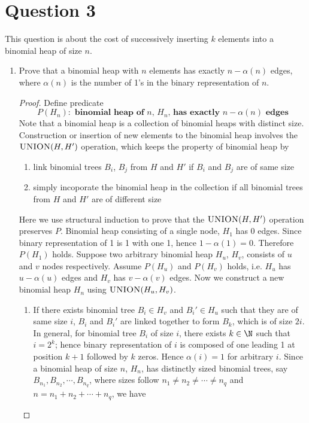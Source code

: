 \documentclass[11pt]{article}
\begin{document}
\section*{Question 3}
This question is about the cost of successively inserting $k$ elements into a
binomial heap of size $n$.
\begin{enumerate}
  \item Prove that a binomial heap with $n$ elements has exactly $n- \alpha(n)$ edges, where $\alpha(n)$ is the
number of 1’s in the binary representation of $n$.
  \begin{proof}
    Define predicate
    \[
      P(H_n): \textbf{ binomial heap of $n$, $H_n$, has exactly $n-\alpha(n)$ edges}
    \]
    Note that a binomial heap is a collection of binomial heaps with distinct size. Construction or insertion of new elements to the binomial heap involves the $\textsc{UNION}(H, H')$ operation, which keeps the property of binomial heap by
    \begin{enumerate}
      \item link binomial trees $B_i$, $B_j$ from $H$ and $H'$ if $B_i$ and $B_j$ are of same size
      \item simply incoporate the binomial heap in the collection if all binomial trees from $H$ and $H'$ are of different size
    \end{enumerate}
    Here we use structural induction to prove that the $\textsc{UNION}(H, H')$ operation preserves $P$. Binomial heap consisting of a single node, $H_1$ has 0 edges. Since binary representation of 1 is 1 with one 1, hence $1-\alpha(1) = 0$. Therefore $P(H_1)$ holds. Suppose two arbitrary binomial heap $H_u$, $H_v$, consists of $u$ and $v$ nodes respectively. Assume $P(H_u)$ and $P(H_v)$ holds, i.e. $H_u$ has $u-\alpha(u)$ edges and $H_v$ has $v-\alpha(v)$ edges. Now we construct a new binomial heap $H_n$ using $\textsc{UNION}(H_u, H_v)$.
    \begin{enumerate}
      \item If there exists binomial tree $B_i \in H_v$ and $B_i' \in H_u$ such that they are of same size $i$, $B_i$ and $B_i'$ are linked together to form $B_k$, which is of size $2i$. In general, for binomial tree $B_i$ of size $i$, there exists $k\in\N$ such that $i = 2^k$; hence binary representation of $i$ is composed of one leading 1 at position $k+1$ followed by $k$ zeros. Hence $\alpha(i) = 1$ for arbitrary $i$. Since a binomial heap of size $n$, $H_n$, has distinctly sized binomial trees, say $B_{n_1}, B_{n_2}, \cdots, B_{n_q}$, where sizes follow $n_1\neq n_2\neq \cdots \neq n_q$ and $n = n_1 + n_2 + \cdots + n_q$, we have

\end{enumerate}
\end{proof}
\end{enumerate}
\end{document}
